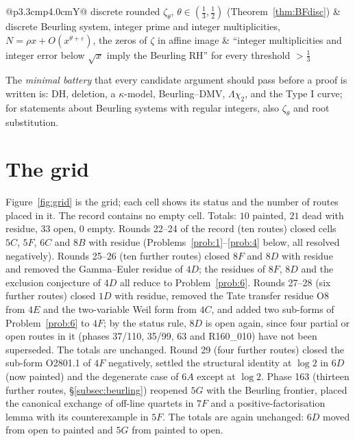 \documentclass[11pt]{amsart}
\theoremstyle{definition}
\theoremstyle{remark}
\begin{document}
\begin{table}[ht]
\begin{tabularx}{\textwidth}{@{}p{3.3cm}p{4.0cm}Y@{}}
discrete rounded $\zeta_\theta$, $\theta\in(\frac13,\frac12)$ (Theorem~\ref{thm:BFdisc}) & discrete Beurling system, integer prime and integer multiplicities, $N=\rho x+O(x^{\theta+\varepsilon})$, the zeros of $\zeta$ in affine image & ``integer multiplicities and integer error below $\sqrt x$ imply the Beurling RH'' for every threshold $>\frac13$ \\
\bottomrule
\end{tabularx}
\end{table}

The \emph{minimal battery} that every candidate argument should pass before a proof is written is: DH,
deletion, a $\kappa$-model, Beurling--DMV, $\Lambda\chi_2$, and the Type I curve; for statements about Beurling systems with regular integers, also $\zeta_\theta$ and root substitution.

\section{The grid}\label{sec:grid}

Figure~\ref{fig:grid} is the grid; each cell shows its status and the number of routes placed in it.
The record contains no empty cell. Totals: $10$ painted, $21$ dead with residue, $33$ open, $0$ empty. Rounds 22--24 of the record (ten routes) closed cells $5C$, $5F$, $6C$ and $8B$ with residue (Problems~\ref{prob:1}--\ref{prob:4} below, all resolved negatively). Rounds 25--26 (ten further routes) closed $8F$ and $8D$ with residue and removed the Gamma--Euler residue of $4D$; the residues of $8F$, $8D$ and the exclusion conjecture of $4D$ all reduce to Problem~\ref{prob:6}. Rounds 27--28 (six further routes) closed $1D$ with residue, removed the Tate transfer residue O8 from $4E$ and the two-variable Weil form from $4C$, and added two sub-forms of Problem~\ref{prob:6} to $4F$; by the status rule, $8D$ is open again, since four partial or open routes in it (phases 37/110, 35/99, 63 and R160\_010) have not been superseded. The totals are unchanged. Round 29 (four further routes) closed the sub-form O2801.1 of $4F$ negatively, settled the structural identity at $\log2$ in $6D$ (now painted) and the degenerate case of $6A$ except at $\log2$. Phase 163 (thirteen further routes, \S\ref{subsec:beurling}) reopened $5G$ with the Beurling frontier, placed the canonical exchange of off-line quartets in $7F$ and a positive-factorisation lemma with its counterexample in $5F$. The totals are again unchanged: $6D$ moved from open to painted and $5G$ from painted to open.
\end{document}
